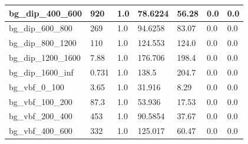 \documentclass[a4paper, 10pt]{article}
\begin{document}
\begin{table}[H]
\begin{center}
\begin{tabular}{|m{23.0mm}|m{23.0mm}|m{18.0mm}|m{19.0mm}|m{19.0mm}|m{19.0mm}|m{19.0mm}|}
      \hline
      {\cellcolor{white}         bg\_dip\_400\_600}& {\cellcolor{white}         920}& {\cellcolor{white}         1.0}& {\cellcolor{white}         78.6224}& {\cellcolor{white}         56.28}& {\cellcolor{green}         0.0}& {\cellcolor{green}         0.0}\\
      \hline
      {\cellcolor{white}         bg\_dip\_600\_800}& {\cellcolor{white}         269}& {\cellcolor{white}         1.0}& {\cellcolor{white}         94.6258}& {\cellcolor{white}         83.07}& {\cellcolor{green}         0.0}& {\cellcolor{green}         0.0}\\
      \hline
      {\cellcolor{white}         bg\_dip\_800\_1200}& {\cellcolor{white}         110}& {\cellcolor{white}         1.0}& {\cellcolor{white}         124.553}& {\cellcolor{white}         124.0}& {\cellcolor{green}         0.0}& {\cellcolor{green}         0.0}\\
      \hline
      {\cellcolor{white}         bg\_dip\_1200\_1600}& {\cellcolor{white}         7.88}& {\cellcolor{white}         1.0}& {\cellcolor{white}         176.706}& {\cellcolor{white}         198.4}& {\cellcolor{green}         0.0}& {\cellcolor{green}         0.0}\\
      \hline
      {\cellcolor{white}         bg\_dip\_1600\_inf}& {\cellcolor{white}         0.731}& {\cellcolor{white}         1.0}& {\cellcolor{white}         138.5}& {\cellcolor{white}         204.7}& {\cellcolor{green}         0.0}& {\cellcolor{green}         0.0}\\
      \hline
      {\cellcolor{white}         bg\_vbf\_0\_100}& {\cellcolor{white}         3.65}& {\cellcolor{white}         1.0}& {\cellcolor{white}         31.916}& {\cellcolor{white}         8.29}& {\cellcolor{green}         0.0}& {\cellcolor{green}         0.0}\\
      \hline
      {\cellcolor{white}         bg\_vbf\_100\_200}& {\cellcolor{white}         87.3}& {\cellcolor{white}         1.0}& {\cellcolor{white}         53.936}& {\cellcolor{white}         17.53}& {\cellcolor{green}         0.0}& {\cellcolor{green}         0.0}\\
      \hline
      {\cellcolor{white}         bg\_vbf\_200\_400}& {\cellcolor{white}         453}& {\cellcolor{white}         1.0}& {\cellcolor{white}         90.5854}& {\cellcolor{white}         37.67}& {\cellcolor{green}         0.0}& {\cellcolor{green}         0.0}\\
      \hline
      {\cellcolor{white}         bg\_vbf\_400\_600}& {\cellcolor{white}         332}& {\cellcolor{white}         1.0}& {\cellcolor{white}         125.017}& {\cellcolor{white}         60.47}& {\cellcolor{green}         0.0}& {\cellcolor{green}         0.0}\\

\end{tabular}
\end{center}
\end{table}
\end{document}
